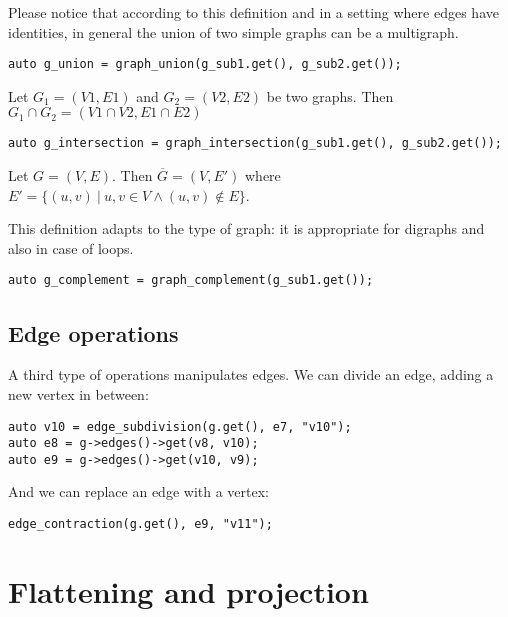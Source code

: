 Please notice that according to this definition and in a setting where edges have identities, in general the union of two simple graphs can be a multigraph.

\begin{lstlisting}[style=c++]
auto g_union = graph_union(g_sub1.get(), g_sub2.get());
\end{lstlisting}

\begin{definition}[Intersection]
Let $G_1 = (V1, E1)$ and $G_2 = (V2, E2)$ be two graphs. Then $G_1 \cap G_2 = (V1 \cap V2, E1 \cap E2)$
\end{definition}

\begin{lstlisting}[style=c++]
auto g_intersection = graph_intersection(g_sub1.get(), g_sub2.get());
\end{lstlisting}

\begin{definition}[Complement]
Let $G = (V, E)$. Then $\overline{G} = (V, E')$ where $ E' = \{ (u,v) \ | \ u, v  \in V \land (u,v) \notin E \}$.
\end{definition}

This definition adapts to the type of graph: it is appropriate for digraphs and also in case of loops.

\begin{lstlisting}[style=c++]
auto g_complement = graph_complement(g_sub1.get());
\end{lstlisting}

\subsection{Edge operations}

A third type of operations manipulates edges. We can divide an edge, adding a new vertex in between:

\begin{lstlisting}[style=c++]
auto v10 = edge_subdivision(g.get(), e7, "v10");
auto e8 = g->edges()->get(v8, v10);
auto e9 = g->edges()->get(v10, v9);
\end{lstlisting}

And we can replace an edge with a vertex:    
\begin{lstlisting}[style=c++]
edge_contraction(g.get(), e9, "v11");
\end{lstlisting}
    
\section{Flattening and projection}

